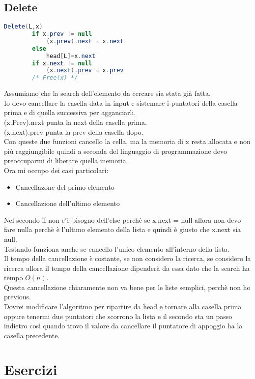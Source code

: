 \subsection{Delete}
\begin{lstlisting}[language=Java]
    Delete(L,x)
        if x.prev != null
            (x.prev).next = x.next
        else
            head[L]=x.next
        if x.next != null
            (x.next).prev = x.prev
        /* Free(x) */
\end{lstlisting}
Assumiamo che la search dell'elemento da cercare sia stata già fatta.\\
Io devo cancellare la casella data in input e sistemare i puntatori della casella prima e di
quella successiva per agganciarli.\\
(x.Prev).next punta la next della casella prima.\\
(x.next).prev punta la prev della casella dopo.\\
Con queste due funzioni cancello la cella, ma la memoria di x resta allocata e non
più raggiungibile quindi a seconda del linguaggio di programmazione devo preoccuparmi
di liberare quella memoria.\\
Ora mi occupo dei casi particolari:
\begin{itemize}
    \item Cancellazone del primo elemento
    \item Cancellazione dell'ultimo elemento
\end{itemize}
Nel secondo if non c'è bisogno dell'else perchè se x.next = null allora
non devo fare nulla perchè è l'ultimo elemento della lista e quindi è giusto che x.next sia null.\\
Testando funziona anche se cancello l'unico elemento all'interno della lista.\\
Il tempo della cancellazione è costante, se non considero la ricerca, se considero la ricerca allora
il tempo della cancellazione dipenderà da essa dato che la search ha tempo $O(n)$.\\
Questa cancellazione chiaramente non va bene per le liste semplici, perchè non ho previous.\\
Dovrei modificare l'algoritmo per ripartire da head e tornare alla casella prima oppure tenermi due
puntatori che scorrono la lista e il secondo sta un passo indietro così quando trovo il valore
da cancellare il puntatore di appoggio ha la casella precedente.
\section{Esercizi}

